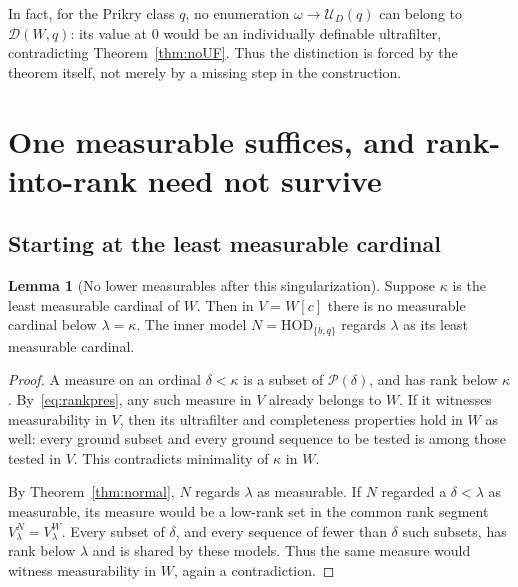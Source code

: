 \documentclass[11pt,letterpaper]{article}
\theoremstyle{definition}
\newtheorem{lemma}[definition]{Lemma}
\numberwithin{equation}{section}
\newcommand{\HOD}{\mathrm{HOD}}
\newcommand{\DD}{\mathscr D}
\newcommand{\UU}{\mathcal U}
\begin{document}
In fact, for the Prikry class $q$, no enumeration $\omega\to\UU_D(q)$ can belong to $\DD(W,q)$: its value at $0$ would be an individually definable ultrafilter, contradicting Theorem~\ref{thm:noUF}. Thus the distinction is forced by the theorem itself, not merely by a missing step in the construction.

\section{One measurable suffices, and rank-into-rank need not survive}\label{sec:calibration}

\subsection{Starting at the least measurable cardinal}

\begin{lemma}[No lower measurables after this singularization]\label{lem:least}
Suppose $\kappa$ is the least measurable cardinal of $W$. Then in $V=W[c]$ there is no measurable cardinal below $\lambda=\kappa$. The inner model $N=\HOD_{\{b,q\}}$ regards $\lambda$ as its least measurable cardinal.
\end{lemma}
\begin{proof}
A measure on an ordinal $\delta<\kappa$ is a subset of $\mathcal P(\delta)$, and has rank below $\kappa$. By~\eqref{eq:rankpres}, any such measure in $V$ already belongs to $W$. If it witnesses measurability in $V$, then its ultrafilter and completeness properties hold in $W$ as well: every ground subset and every ground sequence to be tested is among those tested in $V$. This contradicts minimality of $\kappa$ in $W$.

By Theorem~\ref{thm:normal}, $N$ regards $\lambda$ as measurable. If $N$ regarded a $\delta<\lambda$ as measurable, its measure would be a low-rank set in the common rank segment $V_\lambda^N=V_\lambda^W$. Every subset of $\delta$, and every sequence of fewer than $\delta$ such subsets, has rank below $\lambda$ and is shared by these models. Thus the same measure would witness measurability in $W$, again a contradiction.
\end{proof}
\end{document}
